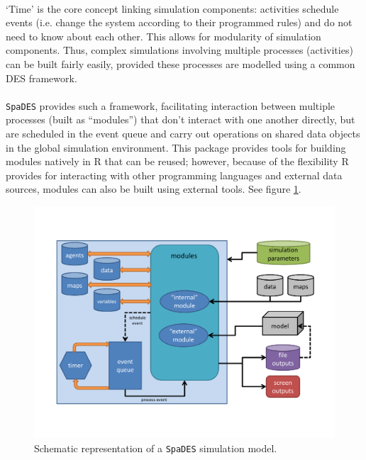 \documentclass{article}
\begin{document}
\paragraph{}
`Time' is the core concept linking simulation components: activities schedule events (i.e. change the system according to their programmed rules) and do not need to know about each other. This allows for modularity of simulation components. Thus, complex simulations involving multiple processes (activities) can be built fairly easily, provided these processes are modelled using a common DES framework.

\paragraph{}
\texttt{SpaDES} provides such a framework, facilitating interaction between multiple processes (built as ``modules'') that don't interact with one another directly, but are scheduled in the event queue and carry out operations on shared data objects in the global simulation environment. This package provides tools for building modules natively in \textsf{R} that can be reused; however, because of the flexibility R provides for interacting with other programming languages and external data sources, modules can also be built using external tools. See figure \ref{figure-SpaDES-overview}.

\begin{figure}[!htbp]
  \centering
	\includegraphics[width=5in]{../inst/SpaDES-overview-diagram.pdf}
	\caption{Schematic representation of a \texttt{SpaDES} simulation model.}
	\label{figure-SpaDES-overview}
\end{figure}
\end{document}

